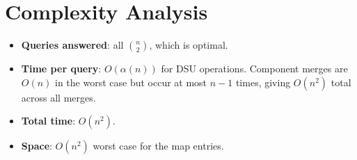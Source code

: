 \documentclass[11pt,a4paper]{article}
\begin{document}
\section{Complexity Analysis}

\begin{itemize}
  \item \textbf{Queries answered}: all $\binom{n}{2}$, which is optimal.
  \item \textbf{Time per query}: $O(\alpha(n))$ for DSU operations. Component merges are $O(n)$ in the worst case but occur at most $n-1$ times, giving $O(n^2)$ total across all merges.
  \item \textbf{Total time}: $O(n^2)$.
  \item \textbf{Space}: $O(n^2)$ worst case for the map entries.
\end{itemize}
\end{document}
